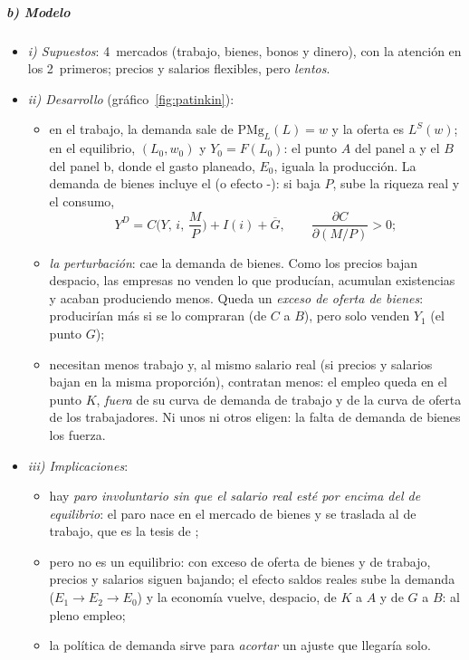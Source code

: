 \documentclass[11pt]{article}
\begin{document}
\subparagraph{b) Modelo}

\begin{itemize}
\item \emph{i) Supuestos}: 4~mercados (trabajo, bienes, bonos y dinero), con la atención en los 2~primeros; precios y salarios flexibles, pero \emph{lentos}.
\item \emph{ii) Desarrollo} (gráfico~\ref{fig:patinkin})\nocite{DeVroey2016History}:
  \begin{itemize}
  \item en el trabajo, la demanda sale de $\mathrm{PMg}_L(L)=w$ y la oferta es $L^S(w)$; en el equilibrio, $(L_0,w_0)$ y $Y_0=F(L_0)$: el punto $A$ del panel a y el $B$ del panel b, donde el gasto planeado, $E_0$, iguala la producción. La demanda de bienes incluye el  (o efecto -): si baja $P$, sube la riqueza real y el consumo,
    \begin{equation}
    Y^D=C\Big(Y,\,i,\,\frac{M}{P}\Big)+I(i)+\overline{G},\qquad \frac{\partial C}{\partial(M/P)}>0; \label{eq:patinkin}
    \end{equation}
  \item \emph{la perturbación}: cae la demanda de bienes. Como los precios bajan despacio, las empresas no venden lo que producían, acumulan existencias y acaban produciendo menos. Queda un \emph{exceso de oferta de bienes}: producirían más si se lo compraran (de $C$ a $B$), pero solo venden $Y_1$ (el punto $G$);
  \item necesitan menos trabajo y, al mismo salario real (si precios y salarios bajan en la misma proporción), contratan menos: el empleo queda en el punto $K$, \emph{fuera} de su curva de demanda de trabajo y de la curva de oferta de los trabajadores. Ni unos ni otros eligen: la falta de demanda de bienes los fuerza.
  \end{itemize}
\item \emph{iii) Implicaciones}:
  \begin{itemize}
  \item hay \emph{paro involuntario sin que el salario real esté por encima del de equilibrio}: el paro nace en el mercado de bienes y se traslada al de trabajo, que es la tesis de ;
  \item pero no es un equilibrio: con exceso de oferta de bienes y de trabajo, precios y salarios siguen bajando; el efecto saldos reales sube la demanda ($E_1\to E_2\to E_0$) y la economía vuelve, despacio, de $K$ a $A$ y de $G$ a $B$: al pleno empleo;
  \item la política de demanda sirve para \emph{acortar} un ajuste que llegaría solo.
  \end{itemize}
\end{itemize}
\end{document}
